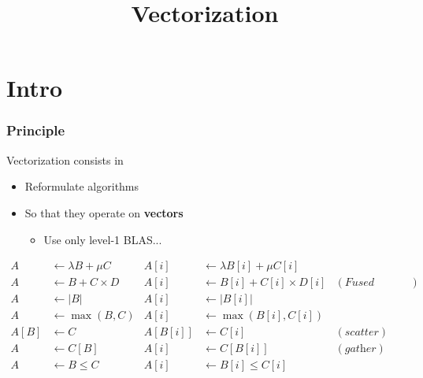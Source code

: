\documentclass[xcolor={x11names,svgnames}]{beamer}
\title{Vectorization}
\begin{document}
\frame{\titlepage}

\section{Intro}


\begin{frame}
  \frametitle{Principle}

  \begin{block}{Vectorization consists in}
    \begin{itemize}
    \item Reformulate algorithms
    \item So that they operate on \textbf{vectors}
      \begin{itemize}
      \item Use only level-1 BLAS...
      \end{itemize}
    \end{itemize}
     
  \end{block}

  \begin{align*}
    A &\gets \lambda B + \mu C & A[i] &\gets \lambda B[i] + \mu C[i]\\
    A &\gets B + C \times D    & A[i] &\gets B[i] + C[i] \times D[i] & (\textit{Fused Multiply-Add}) \\
    A &\gets |B|               & A[i] &\gets |B[i]|  \\
    A &\gets \max(B, C)        & A[i] &\gets \max(B[i], C[i])  \\
    A[B] &\gets C              & A[B[i]] &\gets C[i] & (\textit{scatter}) \\
    A &\gets C[B]              & A[i] &\gets C[B[i]] & (\textit{gather}) \\
    A &\gets B \leq C          & A[i] &\gets B[i] \leq C[i]  \\
  \end{align*}

\end{frame}

\end{document}
